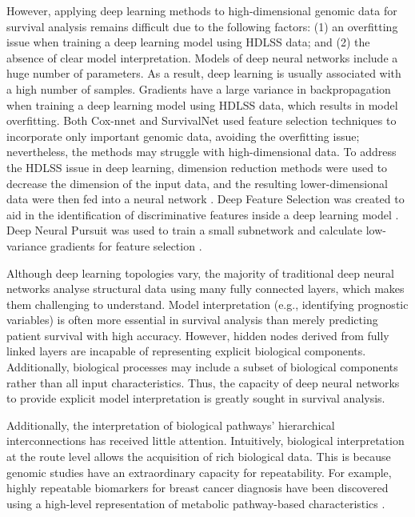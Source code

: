 \documentclass[10pt,twocolumn,twoside,lineno]{gsajnl}
\begin{document}
However, applying deep learning methods to high-dimensional genomic data for survival analysis remains difficult due to the following factors: (1) an overfitting issue when training a deep learning model using HDLSS data; and (2) the absence of clear model interpretation. Models of deep neural networks include a huge number of parameters. As a result, deep learning is usually associated with a high number of samples. Gradients have a large variance in backpropagation when training a deep learning model using HDLSS data, which results in model overfitting. Both Cox-nnet and SurvivalNet used feature selection techniques to incorporate only important genomic data, avoiding the overfitting issue; nevertheless, the methods may struggle with high-dimensional data. To address the HDLSS issue in deep learning, dimension reduction methods were used to decrease the dimension of the input data, and the resulting lower-dimensional data were then fed into a neural network \citep{W2019}. Deep Feature Selection was created to aid in the identification of discriminative features inside a deep learning model \citep{doi:10.1089/cmb.2015.0189}. Deep Neural Pursuit was used to train a small subnetwork and calculate low-variance gradients for feature selection \citep{ijcai2017-318}.



Although deep learning topologies vary, the majority of traditional deep neural networks analyse structural data using many fully connected layers, which makes them challenging to understand. Model interpretation (e.g., identifying prognostic variables) is often more essential in survival analysis than merely predicting patient survival with high accuracy. However, hidden nodes derived from fully linked layers are incapable of representing explicit biological components. Additionally, biological processes may include a subset of biological components rather than all input characteristics. Thus, the capacity of deep neural networks to provide explicit model interpretation is greatly sought in survival analysis.



Additionally, the interpretation of biological pathways' hierarchical interconnections has received little attention. Intuitively, biological interpretation at the route level allows the acquisition of rich biological data. This is because genomic studies have an extraordinary capacity for repeatability. For example, highly repeatable biomarkers for breast cancer diagnosis have been discovered using a high-level representation of metabolic pathway-based characteristics \citep{Huang2016}.
\end{document}
